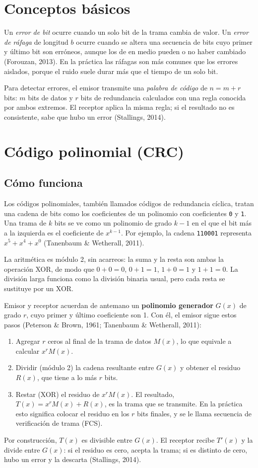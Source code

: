 \documentclass[12pt,letterpaper]{article}
\newcommand{\bits}[1]{\texttt{#1}}
\begin{document}
\section{Conceptos básicos}
Un \emph{error de bit} ocurre cuando un solo bit de la trama cambia de valor. Un \emph{error de ráfaga} de longitud $b$ ocurre cuando se altera una secuencia de bits cuyo primer y último bit son erróneos, aunque los de en medio pueden o no haber cambiado (Forouzan, 2013). En la práctica las ráfagas son más comunes que los errores aislados, porque el ruido suele durar más que el tiempo de un solo bit.

Para detectar errores, el emisor transmite una \emph{palabra de código} de $n = m + r$ bits: $m$ bits de datos y $r$ bits de redundancia calculados con una regla conocida por ambos extremos. El receptor aplica la misma regla; si el resultado no es consistente, sabe que hubo un error (Stallings, 2014).

\section{Código polinomial (CRC)}

\subsection{Cómo funciona}
Los códigos polinomiales, también llamados códigos de redundancia cíclica, tratan una cadena de bits como los coeficientes de un polinomio con coeficientes \bits{0} y \bits{1}. Una trama de $k$ bits se ve como un polinomio de grado $k-1$ en el que el bit más a la izquierda es el coeficiente de $x^{k-1}$. Por ejemplo, la cadena \bits{110001} representa $x^5 + x^4 + x^0$ (Tanenbaum \& Wetherall, 2011).

La aritmética es módulo 2, sin acarreos: la suma y la resta son ambas la operación XOR, de modo que $0+0=0$, $0+1=1$, $1+0=1$ y $1+1=0$. La división larga funciona como la división binaria usual, pero cada resta se sustituye por un XOR.

Emisor y receptor acuerdan de antemano un \textbf{polinomio generador} $G(x)$ de grado $r$, cuyo primer y último coeficiente son 1. Con él, el emisor sigue estos pasos (Peterson \& Brown, 1961; Tanenbaum \& Wetherall, 2011):
\begin{enumerate}[itemsep=2pt]
\item Agregar $r$ ceros al final de la trama de datos $M(x)$, lo que equivale a calcular $x^r M(x)$.
\item Dividir (módulo 2) la cadena resultante entre $G(x)$ y obtener el residuo $R(x)$, que tiene a lo más $r$ bits.
\item Restar (XOR) el residuo de $x^r M(x)$. El resultado, $T(x) = x^r M(x) + R(x)$, es la trama que se transmite. En la práctica esto significa colocar el residuo en los $r$ bits finales, y se le llama secuencia de verificación de trama (FCS).
\end{enumerate}
Por construcción, $T(x)$ es divisible entre $G(x)$. El receptor recibe $T'(x)$ y la divide entre $G(x)$: si el residuo es cero, acepta la trama; si es distinto de cero, hubo un error y la descarta (Stallings, 2014).
\end{document}
